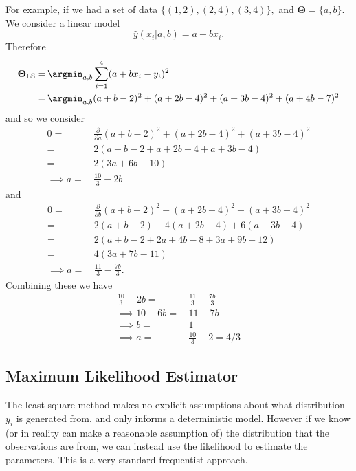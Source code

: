 For example, if we had a set of data $\{(1, 2), (2, 4), (3, 4)\},$ and $\mathbf\Theta = \{a, b\}.$ We consider a linear model $$\hat{y}\left(x_i|a, b\right) = a + bx_i.$$ Therefore
\begin{align*}
    \mathbf{\Theta}_{\mathrm{LS}} =&\, \argmin_{a, b} \sum_{i = 1}^4 (a + bx_i - y_i)^2\\
    =&\, \argmin_{a, b} (a + b - 2)^2 + (a + 2b - 4)^2 + (a + 3b - 4)^2 + (a + 4b - 7)^2
\end{align*} and so we consider
\begin{align*}
    0 =&\, \frac{\partial}{\partial a} (a + b - 2)^2 + (a + 2b - 4)^2 + (a + 3b - 4)^2\\
    =&\, 2(a + b - 2 + a + 2b - 4 + a + 3b - 4)\\
    =&\, 2(3a + 6b - 10)\\
    \implies a =&\, \frac{10}{3} - 2b
\end{align*} and
\begin{align*}
    0 =&\, \frac{\partial}{\partial b} (a + b - 2)^2 + (a + 2b - 4)^2 + (a + 3b - 4)^2\\
    =&\, 2(a + b - 2) + 4(a + 2b - 4) + 6(a + 3b - 4)\\
    =&\, 2(a + b - 2 + 2a + 4b - 8 + 3a + 9b - 12)\\
    =&\, 4(3a + 7b - 11)\\
    \implies a =&\, \frac{11}{3} - \frac{7b}{3}.
\end{align*} Combining these we have
\begin{align*}
    \frac{10}{3} - 2b =&\, \frac{11}{3} - \frac{7b}{3}\\
    \implies 10 - 6b =&\, 11 - 7b\\
    \implies b =&\, 1\\
    \implies a =&\, \frac{10}{3} - 2 = 4/3
\end{align*}

\subsection*{Maximum Likelihood Estimator}

The least square method makes no explicit assumptions about what distribution $y_i$ is generated from, and only informs a deterministic model. However if we know (or in reality can make a reasonable assumption of) the distribution that the observations are from, we can instead use the likelihood to estimate the parameters. This is a very standard frequentist approach.

